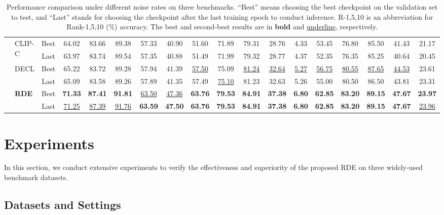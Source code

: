 \documentclass[10pt,twocolumn,letterpaper]{article}
\begin{document}
\begin{table}[t]
{\begin{tabular}{c|lc|ccccc|ccccc|ccccc}
        &\multirow{2}{*}{CLIP-C}&Best& 64.02&83.66&89.38&57.33&40.90&51.60&71.89&79.31&28.76&4.33&53.45&76.80&85.50&41.43&21.17\\
        &&Last& 63.97&83.74&89.54&57.35&40.88&51.49&71.99&79.32&28.77&4.37&52.35&76.35&85.25&40.64&20.45\\
        
        &\multirow{2}{*}{DECL}&Best&65.22&83.72&89.28&57.94&{41.39}&\underline{57.50}&75.09&\underline{81.24}&\underline{32.64}&\underline{5.27}&
\underline{56.75}&\underline{80.55}&\underline{87.65}&\underline{44.53}&{23.61}\\
        &&Last&65.09&83.58&89.26&57.89&41.35&57.49&\underline{75.10}&81.23&32.63&5.26&55.00&80.50&86.50&43.81&23.31\\
        &\multirow{2}{*}{\textbf{RDE}}&Best&\textbf{71.33} & \textbf{87.41} & \textbf{91.81} & \underline{63.50} & \underline{47.36} & \textbf{63.76} & \textbf{79.53} & \textbf{84.91} & \textbf{37.38} & \textbf{6.80} &\textbf{62.85} & \textbf{83.20} & \textbf{89.15} & \textbf{47.67} & \textbf{23.97}\\
        &&Last&\underline{71.25} & \underline{87.39} & \underline{91.76} & \textbf{63.59} & \textbf{47.50} & \textbf{63.76} & \textbf{79.53} & \textbf{84.91} & \textbf{37.38} & \textbf{6.80} &\textbf{62.85} & \textbf{83.20} & \textbf{89.15} & \textbf{47.67} & \underline{23.96}\\
 
        \bottomrule[1.5pt]
    \end{tabular}}
    \caption{Performance comparison under different noise rates on three benchmarks. ``Best'' means choosing the best checkpoint on the validation set to test, and ``Last'' stands for choosing the checkpoint after the last training epoch to conduct inference. R-1,5,10 is an abbreviation for Rank-1,5,10 (\%) accuracy. The best and second-best results are in \textbf{bold} and \underline{underline}, respectively.}
    \label{tabnoise}
    \vspace{-0.4cm}
\end{table}

\section{Experiments}
In this section, we conduct extensive experiments to verify the effectiveness and superiority of the proposed RDE on three widely-used benchmark datasets.

\subsection{Datasets and Settings}
\end{document}
